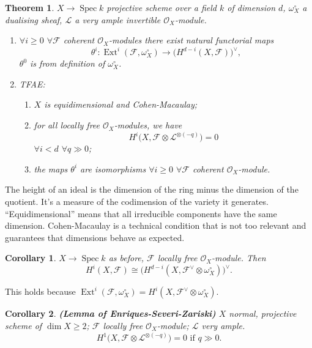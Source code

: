 \documentclass[12pt]{article}
\DeclareMathOperator{\Spec}{Spec}
\DeclareMathOperator{\Ext}{Ext}
\newtheorem*{theorem}{Theorem}
\newtheorem*{corollary}{Corollary}
\theoremstyle{definition}
\begin{document}
\begin{theorem}
$X\rightarrow\Spec k$ projective scheme over a field $k$ of dimension $d$, $\omega_X^\circ$ a dualising sheaf, $\mathcal L$ a very ample invertible $\mathcal O_X$-module.

\begin{enumerate}[label=\arabic*)]
\item $\forall i\geq0$ $\forall\mathcal F$ coherent $\mathcal O_X$-modules there exist natural functorial maps
\[\theta^i:\Ext^i(\mathcal F,\omega_X^\circ)\longrightarrow\big(H^{d-i}(X,\mathcal F)\big)^\vee,\]
$\theta^0$ is from definition of $\omega_X^\circ$.

\item TFAE:
\begin{enumerate}[label=\roman*)]
\item $X$ is equidimensional and Cohen-Macaulay;
\item for all locally free $\mathcal O_X$-modules, we have
\[H^i\big(X,\mathcal F\otimes\mathcal L^{\otimes(-q)}\big)=0\]
$\forall i<d$ $\forall q\gg0$;
\item the maps $\theta^i$ are isomorphisms $\forall i\geq0$ $\forall\mathcal F$ coherent $\mathcal O_X$-module.
\end{enumerate}
\end{enumerate}
\end{theorem}

The height of an ideal is the dimension of the ring minus the dimension of the quotient. It's a measure of the codimension of the variety it generates. ``Equidimensional'' means that all irreducible components have the same dimension. Cohen-Macaulay is a technical condition that is not too relevant and guarantees that dimensions behave as expected.

\begin{corollary}
$X\rightarrow\Spec k$ as before, $\mathcal F$ locally free $\mathcal O_X$-module. Then
\[H^i(X,\mathcal F)\cong\big(H^{d-i}(X,\mathcal F^\vee\otimes\omega_X^\circ)\big)^\vee.\]
\end{corollary}

This holds because $\Ext^i(\mathcal F,\omega_X^\circ)=H^i(X,\mathcal F^\vee\otimes\omega_X^\circ)$.

\begin{corollary}
\emph{\textbf{(Lemma of Enriques-Severi-Zariski)}} $X$ normal, projective scheme of $\dim X\geq2$; $\mathcal F$ locally free $\mathcal O_X$-module; $\mathcal L$ very ample.
\[H^1\big(X,\mathcal F\otimes\mathcal L^{\otimes(-q)}\big)=0\text{ if }q\gg0.\]
\end{corollary}
\end{document}
